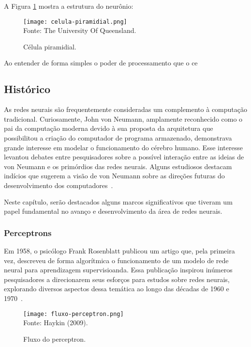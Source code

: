     A Figura \ref{fig:celula_piramidial} mostra a estrutura do neurônio:
    \begin{figure}[!htb]
        \centering
        \caption{Célula piramidial.}
        \texttt{[image: celula-piramidial.png]}\\
        {\footnotesize Fonte: The University Of Queensland.}\
        \label{fig:celula_piramidial}
    \end{figure}
    
    Ao entender de forma simples o poder de processamento que o ce
    \subsection{Histórico}
        As redes neurais são frequentemente consideradas um complemento à computação tradicional. Curiosamente, 
        John von Neumann, amplamente reconhecido como o pai da computação moderna devido à sua proposta da arquitetura 
        que possibilitou a criação do computador de programa armazenado, demonstrava grande interesse em modelar o 
        funcionamento do cérebro humano. Esse interesse levantou debates entre pesquisadores sobre a possível interação 
        entre as ideias de von Neumann e os primórdios das redes neurais. Alguns estudiosos destacam indícios que 
        sugerem a visão de von Neumann sobre as direções futuras do desenvolvimento dos computadores~\cite{Fausett1994}.

        Neste capítulo, serão destacados alguns marcos significativos que tiveram um papel fundamental no avanço e
        desenvolvimento da área de redes neurais.


        \subsubsection{Perceptrons}
            
            Em 1958, o psicólogo Frank Rosenblatt publicou um artigo que, pela primeira vez, descreveu de forma 
            algorítmica o funcionamento de um modelo de rede neural para aprendizagem supervisioanda. Essa 
            publicação inspirou inúmeros pesquisadores a direcionarem seus esforços para estudos sobre redes neurais, 
            explorando diversos aspectos dessa temática ao longo das décadas de 1960 e 1970~\cite{haykin2009neural}.

            \begin{figure}[!htb]
                \centering
                \caption{Fluxo do perceptron.}
                \texttt{[image: fluxo-perceptron.png]}\\
                {\footnotesize Fonte: Haykin (2009).}\
                \label{fig:fluxo-perceptron}
            \end{figure}

